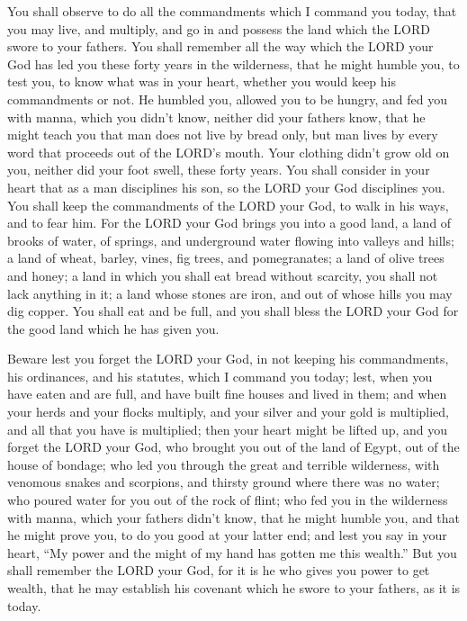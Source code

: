  You shall observe to do all the commandments which I
command you today, that you may live, and multiply, and go in and
possess the land which the LORD swore to your fathers. 
You shall remember all the way which the LORD your God has led you these
forty years in the wilderness, that he might humble you, to test you, to
know what was in your heart, whether you would keep his commandments or
not.  He humbled you, allowed you to be hungry, and fed
you with manna, which you didn't know, neither did your fathers know,
that he might teach you that man does not live by bread only, but man
lives by every word that proceeds out of the LORD's mouth.
 Your clothing didn't grow old on you, neither did your
foot swell, these forty years.  You shall consider in your
heart that as a man disciplines his son, so the LORD your God
disciplines you.  You shall keep the commandments of the
LORD your God, to walk in his ways, and to fear him.  For
the LORD your God brings you into a good land, a land of brooks of
water, of springs, and underground water flowing into valleys and hills;
 a land of wheat, barley, vines, fig trees, and
pomegranates; a land of olive trees and honey;  a land in
which you shall eat bread without scarcity, you shall not lack anything
in it; a land whose stones are iron, and out of whose hills you may dig
copper.  You shall eat and be full, and you shall bless
the LORD your God for the good land which he has given you.

 Beware lest you forget the LORD your God, in not keeping
his commandments, his ordinances, and his statutes, which I command you
today;  lest, when you have eaten and are full, and have
built fine houses and lived in them;  and when your herds
and your flocks multiply, and your silver and your gold is multiplied,
and all that you have is multiplied;  then your heart
might be lifted up, and you forget the LORD your God, who brought you
out of the land of Egypt, out of the house of bondage; 
who led you through the great and terrible wilderness, with venomous
snakes and scorpions, and thirsty ground where there was no water; who
poured water for you out of the rock of flint;  who fed
you in the wilderness with manna, which your fathers didn't know, that
he might humble you, and that he might prove you, to do you good at your
latter end;  and lest you say in your heart, ``My power
and the might of my hand has gotten me this wealth.'' 
But you shall remember the LORD your God, for it is he who gives you
power to get wealth, that he may establish his covenant which he swore
to your fathers, as it is today.

